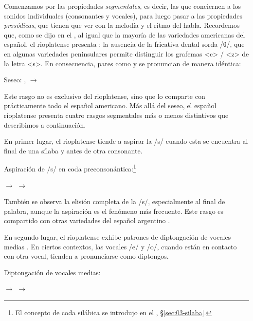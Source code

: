 Comenzamos por las propiedades \textit{segmentales}, es decir, las que conciernen
a los sonidos individuales (consonantes y vocales), para luego pasar a las
propiedades \textit{prosódicas}, que tienen que ver con la melodía y el ritmo del
habla. Recordemos que, como se dijo en el , al igual que la mayoría de
las variedades americanas del español, el rioplatense presenta :
la ausencia de la fricativa dental sorda /θ/, que en algunas variedades
peninsulares permite distinguir los grafemas <c> / <z> de la letra <s>. En
consecuencia, pares como  y  se pronuncian de manera
idéntica:

\begin{exe}
  \ex\label{ex:15-seseo} Seseo: ,  $\rightarrow$
\end{exe}

Este rasgo no es exclusivo del rioplatense, sino que lo comparte con
prácticamente todo el español americano. Más allá del seseo, el español
rioplatense presenta cuatro rasgos segmentales más o menos distintivos que
describimos a continuación.

En primer lugar, el rioplatense tiende a aspirar la /s/ cuando esta se encuentra
al final de una sílaba y antes de otra consonante.

\begin{exe}
  \ex\label{ex:15-aspiracion} Aspiración de /s/ en coda
      preconsonántica:\footnote{El concepto de coda silábica se introdujo en el
      , §\ref{sec:03-silaba}.}
    \begin{xlist}
      \ex {} $\rightarrow$ 
      \ex {} $\rightarrow$ 
    \end{xlist}
\end{exe}


También se observa la elisión completa de la /s/, especialmente al final de
palabra, aunque la aspiración es el fenómeno más frecuente. Este rasgo es
compartido con otras variedades del español argentino
\parencite{terrell1978,donni1984}.

En segundo lugar, el rioplatense exhibe patrones de diptongación de vocales
medias \parencite{luis1983}. En ciertos contextos, las vocales /e/ y /o/, cuando
están en contacto con otra vocal, tienden a pronunciarse como diptongos.

\begin{exe}
  \ex\label{ex:15-diptongacion} Diptongación de vocales medias:
    \begin{xlist}
      \ex {} $\rightarrow$ 
      \ex {} $\rightarrow$ 
    \end{xlist}
\end{exe}


